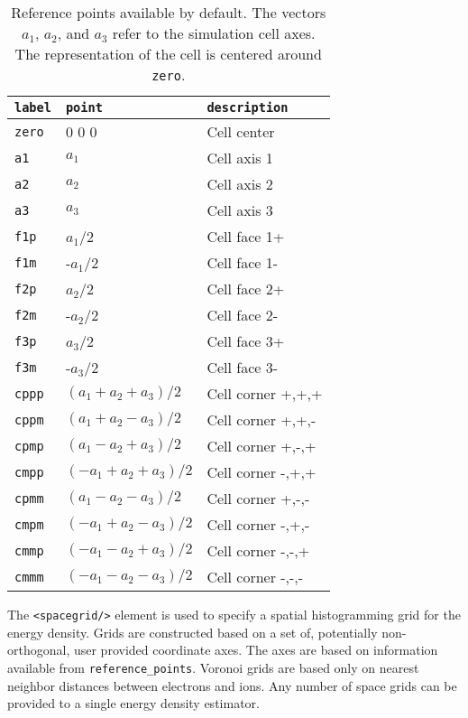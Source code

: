 \FloatBarrier
\begin{table}[h]
\begin{center}
\begin{tabular}{l l l}
\hline
\texttt{label} & \texttt{point} & \texttt{description} \\
\hline
\texttt{zero} & 0 0 0    & Cell center  \\
\texttt{a1}   &  $a_1$   & Cell axis 1  \\
\texttt{a2}   &  $a_2$   & Cell axis 2  \\
\texttt{a3}   &  $a_3$   & Cell axis 3  \\
\texttt{f1p}  &  $a_1$/2 & Cell face 1+ \\
\texttt{f1m}  & -$a_1$/2 & Cell face 1- \\
\texttt{f2p}  &  $a_2$/2 & Cell face 2+ \\
\texttt{f2m}  & -$a_2$/2 & Cell face 2- \\
\texttt{f3p}  &  $a_3$/2 & Cell face 3+ \\
\texttt{f3m}  & -$a_3$/2 & Cell face 3- \\
\texttt{cppp} & $(a_1+a_2+a_3)/2$  & Cell corner +,+,+ \\
\texttt{cppm} & $(a_1+a_2-a_3)/2$  & Cell corner +,+,- \\
\texttt{cpmp} & $(a_1-a_2+a_3)/2$  & Cell corner +,-,+ \\
\texttt{cmpp} & $(-a_1+a_2+a_3)/2$ & Cell corner -,+,+ \\
\texttt{cpmm} & $(a_1-a_2-a_3)/2$  & Cell corner +,-,- \\
\texttt{cmpm} & $(-a_1+a_2-a_3)/2$ & Cell corner -,+,- \\
\texttt{cmmp} & $(-a_1-a_2+a_3)/2$ & Cell corner -,-,+ \\
\texttt{cmmm} & $(-a_1-a_2-a_3)/2$ & Cell corner -,-,- \\
\hline
\end{tabular}
\end{center}
\caption{Reference points available by default.  The vectors $a_1$, $a_2$, and $a_3$ refer to the simulation cell axes.  The representation of the cell is centered around \texttt{zero}.  \label{tab:ref_points}}
\end{table}
\FloatBarrier



The \texttt{<spacegrid/>} element is used to specify a spatial histogramming grid for the energy density.  Grids are constructed based on a set of, potentially non-orthogonal, user provided coordinate axes.  The axes are based on information available from \texttt{reference\_points}.  Voronoi grids are based only on nearest neighbor distances between electrons and ions.  Any number of space grids can be provided to a single energy density estimator.


